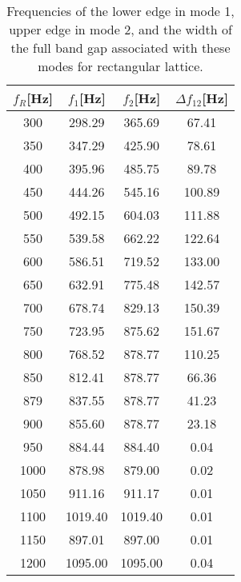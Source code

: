 \documentclass{article}
\begin{document}
\begin{table}[htb]
\centering
\caption{Frequencies of the lower edge in mode 1, upper edge in mode 2, and the width of the full band gap associated with these modes for rectangular lattice.}
\label{tab200}
\begin{tabular}{cccc}
\hline
$f_R$[Hz] & $f_1$[Hz] & $f_2$[Hz] & $\Delta f _{12}$[Hz] \\ \hline
300 & 298.29 & 365.69 & 67.41 \\ \hline
350 & 347.29 & 425.90 & 78.61 \\ \hline
400 & 395.96 & 485.75 & 89.78 \\ \hline
450 & 444.26 & 545.16 & 100.89 \\ \hline
500 & 492.15 & 604.03 & 111.88 \\ \hline
550 & 539.58 & 662.22 & 122.64 \\ \hline
600 & 586.51 & 719.52 & 133.00 \\ \hline
650 & 632.91 & 775.48 & 142.57 \\ \hline
700 & 678.74 & 829.13 & 150.39 \\ \hline
750 & 723.95 & 875.62 & 151.67 \\ \hline
800 & 768.52 & 878.77 & 110.25 \\ \hline
850 & 812.41 & 878.77 & 66.36 \\ \hline
879 & 837.55 & 878.77 & 41.23 \\ \hline
900 & 855.60 & 878.77 & 23.18 \\ \hline
950 & 884.44 & 884.40 & 0.04 \\ \hline
1000 & 878.98 & 879.00 & 0.02 \\ \hline
1050 & 911.16 & 911.17 & 0.01 \\ \hline
1100 & 1019.40 & 1019.40 & 0.01 \\ \hline
1150 & 897.01 & 897.00 & 0.01 \\ \hline
1200 & 1095.00 & 1095.00 & 0.04 \\ \hline
\end{tabular}
\end{table}
\end{document}
